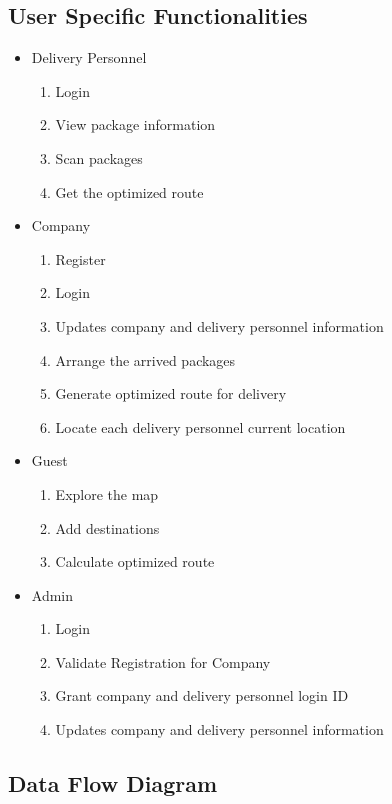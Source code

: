 \documentclass{article}
\begin{document}
\subsection{User Specific Functionalities}
\begin{itemize}
    \item Delivery Personnel 
    \begin{enumerate}
        \item Login
        \item View package information
        \item Scan packages
        \item Get the optimized route
    \end{enumerate}
    \item Company
    \begin{enumerate}
        \item Register
        \item Login
        \item Updates company and delivery personnel information
        \item Arrange the arrived packages
        \item Generate optimized route for delivery
        \item Locate each delivery personnel current location
    \end{enumerate}
    \item Guest
    \begin{enumerate}
        \item Explore the map
        \item Add destinations
        \item Calculate optimized route
    \end{enumerate}
    \item Admin
    \begin{enumerate}
        \item Login
        \item Validate Registration for Company
        \item Grant company and delivery personnel login ID
        \item Updates company and delivery personnel information      
    \end{enumerate}
\end{itemize}

\newpage
\subsection{Data Flow Diagram}
\end{document}
